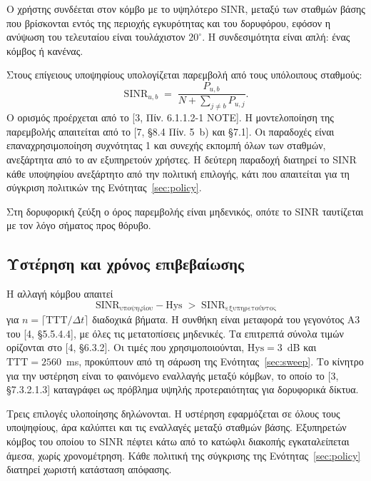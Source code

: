 \documentclass[11pt,a4paper]{article}
\begin{document}
Ο χρήστης συνδέεται στον κόμβο με το υψηλότερο SINR, μεταξύ των σταθμών βάσης
που βρίσκονται εντός της περιοχής εγκυρότητας και του δορυφόρου, εφόσον η
ανύψωση του τελευταίου είναι τουλάχιστον $20^\circ$. Η συνδεσιμότητα είναι
απλή: ένας κόμβος ή κανένας.

Στους επίγειους υποψηφίους υπολογίζεται παρεμβολή από τους υπόλοιπους σταθμούς:
\begin{equation}
\mathrm{SINR}_{u,b} \;=\; \frac{P_{u,b}}{N + \sum_{j\neq b} P_{u,j}} .
\end{equation}
Ο ορισμός προέρχεται από το [3, Πίν. 6.1.1.2-1 NOTE]. Η μοντελοποίηση της
παρεμβολής απαιτείται από το [7, §8.4 Πίν. 5~b) και §7.1]. Οι παραδοχές είναι
επαναχρησιμοποίηση συχνότητας 1 και συνεχής εκπομπή όλων των σταθμών,
ανεξάρτητα από το αν εξυπηρετούν χρήστες. Η δεύτερη παραδοχή διατηρεί το SINR
κάθε υποψηφίου ανεξάρτητο από την πολιτική επιλογής, κάτι που απαιτείται για τη
σύγκριση πολιτικών της Ενότητας~\ref{sec:policy}.

Στη δορυφορική ζεύξη ο όρος παρεμβολής είναι μηδενικός, οπότε το SINR ταυτίζεται
με τον λόγο σήματος προς θόρυβο.

\subsection{Υστέρηση και χρόνος επιβεβαίωσης}

Η αλλαγή κόμβου απαιτεί
\begin{equation}
\mathrm{SINR}_{\text{υποψηφίου}} - \mathrm{Hys} \;>\; \mathrm{SINR}_{\text{εξυπηρετούντος}}
\end{equation}
για $n = \lceil \mathrm{TTT}/\Delta t \rceil$ διαδοχικά βήματα. Η συνθήκη είναι
μεταφορά του γεγονότος A3 του [4, §5.5.4.4], με όλες τις μετατοπίσεις μηδενικές.
Τα επιτρεπτά σύνολα τιμών ορίζονται στο [4, §6.3.2]. Οι τιμές που
χρησιμοποιούνται, $\mathrm{Hys} = 3$~dB και $\mathrm{TTT} = 2560$~ms, προκύπτουν
από τη σάρωση της Ενότητας~\ref{sec:sweep}. Το κίνητρο για την υστέρηση είναι
το φαινόμενο εναλλαγής μεταξύ κόμβων, το οποίο το [3, §7.3.2.1.3] καταγράφει ως
πρόβλημα υψηλής προτεραιότητας για δορυφορικά δίκτυα.

Τρεις επιλογές υλοποίησης δηλώνονται. Η υστέρηση εφαρμόζεται σε όλους τους
υποψηφίους, άρα καλύπτει και τις εναλλαγές μεταξύ σταθμών βάσης. Εξυπηρετών
κόμβος του οποίου το SINR πέφτει κάτω από το κατώφλι διακοπής εγκαταλείπεται
άμεσα, χωρίς χρονομέτρηση. Κάθε πολιτική της σύγκρισης της
Ενότητας~\ref{sec:policy} διατηρεί χωριστή κατάσταση απόφασης.
\end{document}
